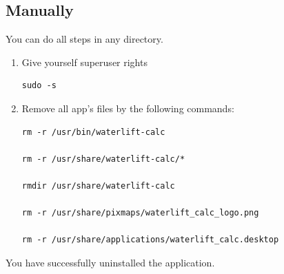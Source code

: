 \documentclass[a5paper, 10pt]{article}
\begin{document}
    \subsection{Manually}
    You can do all steps in any directory.
    \begin{enumerate}
        \item Give yourself superuser rights
            \lstset{language=bash, frame=lines}
            \begin{lstlisting}
sudo -s
            \end{lstlisting}
        \item Remove all app's files by the following commands:
            \begin{lstlisting}
rm -r /usr/bin/waterlift-calc

rm -r /usr/share/waterlift-calc/*

rmdir /usr/share/waterlift-calc

rm -r /usr/share/pixmaps/waterlift_calc_logo.png

rm -r /usr/share/applications/waterlift_calc.desktop
            \end{lstlisting}
    \end{enumerate}
        
You have successfully uninstalled the application.
\end{document}
